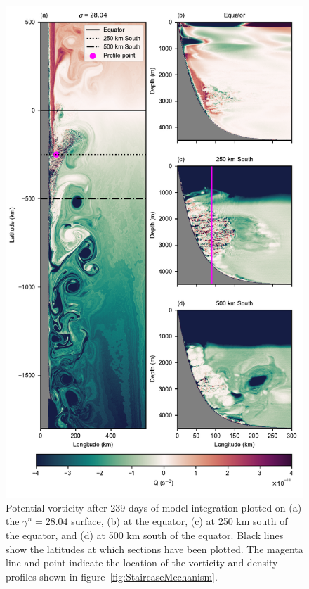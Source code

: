 \begin{figure}[p]
    \centering
    \includegraphics{../figures/Figure4.pdf}
    \caption{Potential vorticity after 239 days of model integration plotted on (a) the $\gamma^n = 28.04$ surface, (b) at the equator, (c) at 250 km south of the equator, and (d) at 500 km south of the equator. Black lines show the latitudes at which sections have been plotted. The magenta line and point indicate the location of the vorticity and density profiles shown in figure~\ref{fig:StaircaseMechanism}.}
    \label{fig:PV}
\end{figure}

